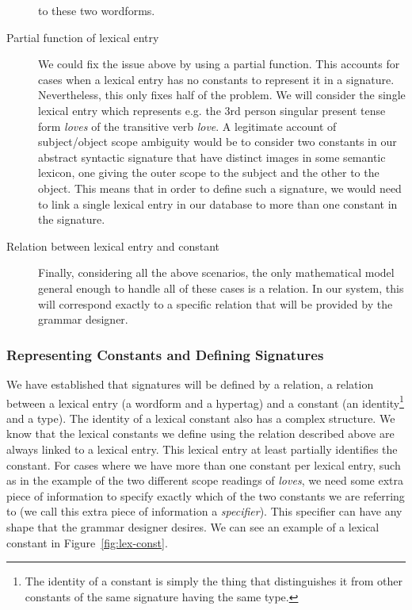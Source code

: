 \begin{description}
    to these two wordforms.
  \item[Partial function of lexical entry] We could fix the issue above
    by using a partial function. This accounts for cases when a lexical
    entry has no constants to represent it in a signature. Nevertheless,
    this only fixes half of the problem. We will consider the single
    lexical entry which represents e.g. the 3rd person singular present
    tense form \emph{loves} of the transitive verb \emph{love}. A
    legitimate account of subject/object scope ambiguity would be to
    consider two constants in our abstract syntactic signature that have
    distinct images in some semantic lexicon, one giving the outer scope
    to the subject and the other to the object. This means that in order
    to define such a signature, we would need to link a single lexical
    entry in our database to more than one constant in the signature.
  \item[Relation between lexical entry and constant] Finally,
    considering all the above scenarios, the only mathematical model
    general enough to handle all of these cases is a relation. In our
    system, this will correspond exactly to a specific relation that
    will be provided by the grammar designer.
\end{description}

\subsubsection{Representing Constants and Defining Signatures}

We have established that signatures will be defined by a relation, a
relation between a lexical entry (a wordform and a hypertag) and a
constant (an identity\footnote{The identity of a constant is simply the
  thing that distinguishes it from other constants of the same signature
  having the same type.} and a type). The identity of a lexical constant
also has a complex structure. We know that the lexical constants we
define using the relation described above are always linked to a lexical
entry. This lexical entry at least partially identifies the
constant. For cases where we have more than one constant per lexical
entry, such as in the example of the two different scope readings of
\emph{loves}, we need some extra piece of information to specify exactly
which of the two constants we are referring to (we call this extra piece
of information a \emph{specifier}). This specifier can have any shape
that the grammar designer desires. We can see an example of a lexical
constant in Figure~\ref{fig:lex-const}.

